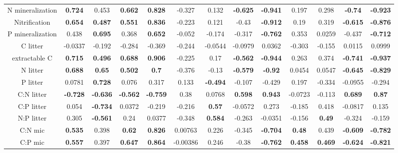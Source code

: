 \documentclass[10pt]{article}
\begin{document}
\begin{landscape}
\begin{table}[h!]
\begin{center}
{\begin{tabular}{ccccccccccccc}
  N mineralization & \textbf{ 0.724 } & 0.453 & \textbf{ 0.662 } & \textbf{ 0.828 } & -0.327 & 0.132 & \textbf{ -0.625 } & \textbf{ -0.941 } & 0.197 & 0.298 & \textbf{ -0.74 } & \textbf{ -0.923 } \\ 
  Nitrification & \textbf{ 0.654 } & \textbf{ 0.487 } & \textbf{ 0.551 } & \textbf{ 0.836 } & -0.223 & 0.121 & -0.43 & \textbf{ -0.912 } & 0.19 & 0.319 & \textbf{ -0.615 } & \textbf{ -0.876 } \\ 
  P mineralization & 0.438 & \textbf{ 0.695 } & 0.368 & \textbf{ 0.652 } & -0.052 & -0.174 & -0.317 & \textbf{ -0.762 } & 0.353 & 0.0259 & -0.437 & \textbf{ -0.712 } \\ 
  C litter & -0.0337 & -0.192 & -0.284 & -0.369 & -0.244 & -0.0544 & -0.0979 & 0.0362 & -0.303 & -0.155 & 0.0115 & 0.0999 \\ 
  extractable C & \textbf{ 0.715 } & \textbf{ 0.496 } & \textbf{ 0.688 } & \textbf{ 0.906 } & -0.225 & 0.17 & \textbf{ -0.562 } & \textbf{ -0.944 } & 0.263 & 0.374 & \textbf{ -0.741 } & \textbf{ -0.937 } \\ 
  N litter & \textbf{ 0.688 } & \textbf{ 0.65 } & \textbf{ 0.502 } & \textbf{  0.7 } & -0.376 & -0.13 & \textbf{ -0.579 } & \textbf{ -0.92 } & 0.0454 & 0.0547 & \textbf{ -0.645 } & \textbf{ -0.829 } \\ 
  P litter & 0.0781 & \textbf{ 0.728 } & 0.076 & 0.317 & 0.133 & \textbf{ -0.494 } & -0.107 & -0.429 & 0.197 & -0.334 & -0.0955 & -0.294 \\ 
  C:N litter & \textbf{ -0.728 } & \textbf{ -0.636 } & \textbf{ -0.562 } & \textbf{ -0.759 } & 0.38 & 0.0768 & \textbf{ 0.598 } & \textbf{ 0.943 } & -0.0723 & -0.113 & \textbf{ 0.689 } & \textbf{ 0.87 } \\ 
  C:P litter & 0.054 & \textbf{ -0.734 } & 0.0372 & -0.219 & -0.216 & \textbf{ 0.57 } & -0.0572 & 0.273 & -0.185 & 0.418 & -0.0817 & 0.135 \\ 
  N:P litter & 0.305 & \textbf{ -0.561 } & 0.24 & 0.0377 & -0.348 & \textbf{ 0.584 } & -0.263 & -0.0351 & -0.156 & \textbf{ 0.49 } & -0.324 & -0.159 \\ 
  C:N mic & \textbf{ 0.535 } & 0.398 & \textbf{ 0.62 } & \textbf{ 0.826 } & 0.00763 & 0.226 & -0.345 & \textbf{ -0.704 } & \textbf{ 0.48 } & 0.439 & \textbf{ -0.609 } & \textbf{ -0.782 } \\ 
  C:P mic & \textbf{ 0.557 } & 0.397 & \textbf{ 0.647 } & \textbf{ 0.864 } & -0.00386 & 0.246 & -0.38 & \textbf{ -0.762 } & \textbf{ 0.458 } & \textbf{ 0.469 } & \textbf{ -0.624 } & \textbf{ -0.821 } \\ 

\end{tabular}}
\end{center}
\end{table}
\end{landscape}
\end{document}

